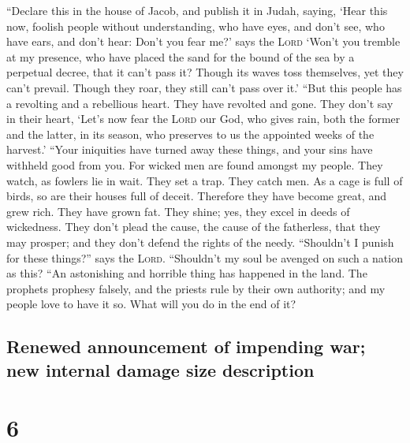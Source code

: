  ``Declare this in the house of Jacob, and publish it in
Judah, saying,  `Hear this now, foolish people without
understanding, who have eyes, and don't see, who have ears, and don't
hear:  Don't you fear me?' says the \textsc{Lord} `Won't
you tremble at my presence, who have placed the sand for the bound of
the sea by a perpetual decree, that it can't pass it? Though its waves
toss themselves, yet they can't prevail. Though they roar, they still
can't pass over it.'  ``But this people has a revolting
and a rebellious heart. They have revolted and gone. 
They don't say in their heart, `Let's now fear the \textsc{Lord} our
God, who gives rain, both the former and the latter, in its season, who
preserves to us the appointed weeks of the harvest.' 
``Your iniquities have turned away these things, and your sins have
withheld good from you.  For wicked men are found amongst
my people. They watch, as fowlers lie in wait. They set a trap. They
catch men.  As a cage is full of birds, so are their
houses full of deceit. Therefore they have become great, and grew rich.
 They have grown fat. They shine; yes, they excel in
deeds of wickedness. They don't plead the cause, the cause of the
fatherless, that they may prosper; and they don't defend the rights of
the needy.  ``Shouldn't I punish for these things?'' says
the \textsc{Lord}. ``Shouldn't my soul be avenged on such a nation as
this?  ``An astonishing and horrible thing has happened
in the land.  The prophets prophesy falsely, and the
priests rule by their own authority; and my people love to have it so.
What will you do in the end of it?

\hypertarget{renewed-announcement-of-impending-war-new-internal-damage-size-description}{%
\subsection{Renewed announcement of impending war; new internal damage
size
description}\label{renewed-announcement-of-impending-war-new-internal-damage-size-description}}

\hypertarget{section-5}{%
\section{6}\label{section-5}}

